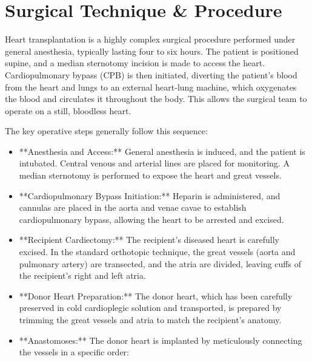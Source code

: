 \section*{Surgical Technique \& Procedure}
Heart transplantation is a highly complex surgical procedure performed under general anesthesia, typically lasting four to six hours. The patient is positioned supine, and a median sternotomy incision is made to access the heart. Cardiopulmonary bypass (CPB) is then initiated, diverting the patient's blood from the heart and lungs to an external heart-lung machine, which oxygenates the blood and circulates it throughout the body. This allows the surgical team to operate on a still, bloodless heart.

The key operative steps generally follow this sequence:

\begin{itemize}
  \item **Anesthesia and Access:** General anesthesia is induced, and the patient is intubated. Central venous and arterial lines are placed for monitoring. A median sternotomy is performed to expose the heart and great vessels.
  
  \item **Cardiopulmonary Bypass Initiation:** Heparin is administered, and cannulas are placed in the aorta and venae cavae to establish cardiopulmonary bypass, allowing the heart to be arrested and excised.
  
  \item **Recipient Cardiectomy:** The recipient's diseased heart is carefully excised. In the standard orthotopic technique, the great vessels (aorta and pulmonary artery) are transected, and the atria are divided, leaving cuffs of the recipient's right and left atria.
  
  \item **Donor Heart Preparation:** The donor heart, which has been carefully preserved in cold cardioplegic solution and transported, is prepared by trimming the great vessels and atria to match the recipient's anatomy.
  
  \item **Anastomoses:** The donor heart is implanted by meticulously connecting the vessels in a specific order:
  

\end{itemize}
